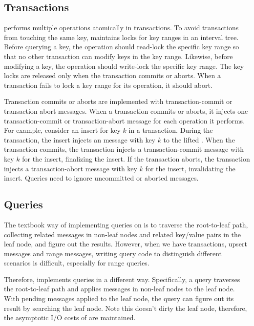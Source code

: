 \subsection{Transactions}
\label{sec:bg:impl:txn}

\Fti performs multiple operations atomically in transactions.
To avoid transactions from touching the same key, \fti maintains locks for key
ranges in an interval tree.
Before querying a key, the operation should read-lock the specific key range so
that no other transaction can modify keys in the key range.
Likewise, before modifying a key, the operation should write-lock the specific
key range.
The key locks are released only when the transaction commits or aborts.
When a transaction fails to lock a key range for its operation, it should
abort.

Transaction commits or aborts are implemented with transaction-commit or
transaction-abort messages.
When a transaction commits or aborts, it injects one transaction-commit or
transaction-abort message for each operation it performs.
For example, consider an insert for key $k$ in a transaction.
During the transaction, the insert injects an \putm message with key $k$
to the lifted \bet.
When the transaction commits, the transaction injects a transaction-commit
message with key $k$ for the insert, finalizing the insert.
If the transaction aborts, the transaction injects a transaction-abort message
with key $k$ for the insert, invalidating the insert.
Queries need to ignore uncommitted or aborted messages.

\subsection{Queries}
\label{sec:bg:impl:query}

The textbook way of implementing queries on \bets is to traverse the
root-to-leaf path, collecting related messages in non-leaf nodes and related
key/value pairs in the leaf node,
and figure out the results.
However, when we have transactions, upsert messages and range messages,
writing query code to distinguish different scenarios is difficult,
especially for range queries.

Therefore, \fti implements queries in a different way.
Specifically, a query traverses the root-to-leaf path and applies messages in
non-leaf nodes to the leaf node.
With pending messages applied to the leaf node, the query can figure out its
result by searching the leaf node.
Note this doesn't dirty the leaf node, therefore,
the asymptotic I/O costs of \bets are maintained.

